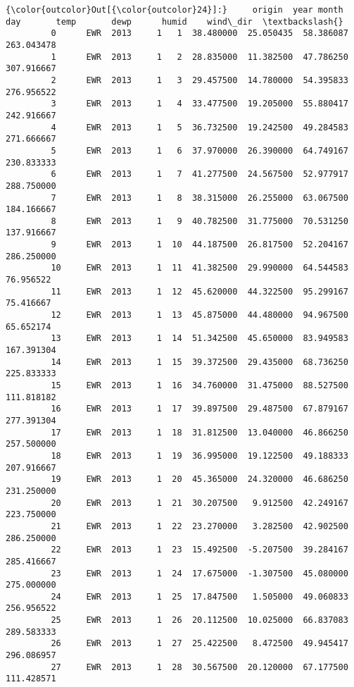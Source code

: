 \documentclass[11pt]{article}
\begin{document}
\begin{Verbatim}[commandchars=\\\{\}]
{\color{outcolor}Out[{\color{outcolor}24}]:}     origin  year month day       temp       dewp      humid    wind\_dir  \textbackslash{}
         0      EWR  2013     1   1  38.480000  25.050435  58.386087  263.043478   
         1      EWR  2013     1   2  28.835000  11.382500  47.786250  307.916667   
         2      EWR  2013     1   3  29.457500  14.780000  54.395833  276.956522   
         3      EWR  2013     1   4  33.477500  19.205000  55.880417  242.916667   
         4      EWR  2013     1   5  36.732500  19.242500  49.284583  271.666667   
         5      EWR  2013     1   6  37.970000  26.390000  64.749167  230.833333   
         6      EWR  2013     1   7  41.277500  24.567500  52.977917  288.750000   
         7      EWR  2013     1   8  38.315000  26.255000  63.067500  184.166667   
         8      EWR  2013     1   9  40.782500  31.775000  70.531250  137.916667   
         9      EWR  2013     1  10  44.187500  26.817500  52.204167  286.250000   
         10     EWR  2013     1  11  41.382500  29.990000  64.544583   76.956522   
         11     EWR  2013     1  12  45.620000  44.322500  95.299167   75.416667   
         12     EWR  2013     1  13  45.875000  44.480000  94.967500   65.652174   
         13     EWR  2013     1  14  51.342500  45.650000  83.949583  167.391304   
         14     EWR  2013     1  15  39.372500  29.435000  68.736250  225.833333   
         15     EWR  2013     1  16  34.760000  31.475000  88.527500  111.818182   
         16     EWR  2013     1  17  39.897500  29.487500  67.879167  277.391304   
         17     EWR  2013     1  18  31.812500  13.040000  46.866250  257.500000   
         18     EWR  2013     1  19  36.995000  19.122500  49.188333  207.916667   
         19     EWR  2013     1  20  45.365000  24.320000  46.686250  231.250000   
         20     EWR  2013     1  21  30.207500   9.912500  42.249167  223.750000   
         21     EWR  2013     1  22  23.270000   3.282500  42.902500  286.250000   
         22     EWR  2013     1  23  15.492500  -5.207500  39.284167  285.416667   
         23     EWR  2013     1  24  17.675000  -1.307500  45.080000  275.000000   
         24     EWR  2013     1  25  17.847500   1.505000  49.060833  256.956522   
         25     EWR  2013     1  26  20.112500  10.025000  66.837083  289.583333   
         26     EWR  2013     1  27  25.422500   8.472500  49.945417  296.086957   
         27     EWR  2013     1  28  30.567500  20.120000  67.177500  111.428571   

\end{Verbatim}
\end{document}
